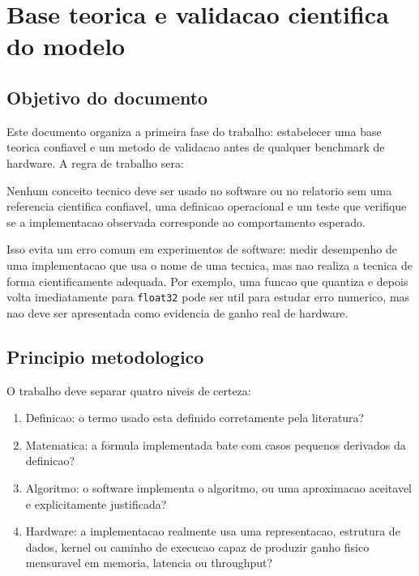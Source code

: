 

\chapter{Base teorica e validacao cientifica do modelo}



\section{Objetivo do documento}





Este documento organiza a primeira fase do trabalho: estabelecer uma base teorica confiavel e um metodo de validacao antes de qualquer benchmark de hardware. A regra de trabalho sera:



\begin{icquote}
Nenhum conceito tecnico deve ser usado no software ou no relatorio sem uma referencia cientifica confiavel, uma definicao operacional e um teste que verifique se a implementacao observada corresponde ao comportamento esperado.
\end{icquote}







Isso evita um erro comum em experimentos de software: medir desempenho de uma implementacao que usa o nome de uma tecnica, mas nao realiza a tecnica de forma cientificamente adequada. Por exemplo, uma funcao que quantiza e depois volta imediatamente para \texttt{float32} pode ser util para estudar erro numerico, mas nao deve ser apresentada como evidencia de ganho real de hardware.



\section{Principio metodologico}



O trabalho deve separar quatro niveis de certeza:


\begin{enumerate}
\item Definicao: o termo usado esta definido corretamente pela literatura?
\item Matematica: a formula implementada bate com casos pequenos derivados da
definicao?
\item Algoritmo: o software implementa o algoritmo, ou uma aproximacao aceitavel e
explicitamente justificada?
\item Hardware: a implementacao realmente usa uma representacao,
estrutura de dados, kernel ou caminho de execucao capaz de produzir ganho
fisico mensuravel em memoria, latencia ou throughput?
\end{enumerate}





